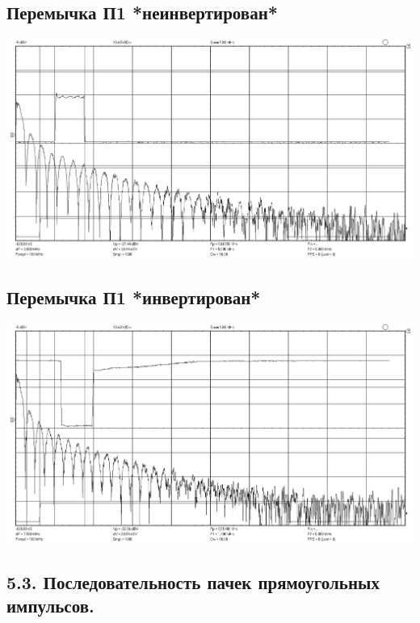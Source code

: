 \documentclass[12pt,a4paper]{article}
\begin{document}
\subsection*{Перемычка П1 *неинвертирован*}
\begin{center}
	\includegraphics[width=.8\linewidth]{data/52}\hfill
\end{center}	
\subsection*{Перемычка П1 *инвертирован*}
\begin{center}
	\includegraphics[width=.8\linewidth]{data/52_inv}\hfill
\end{center}	
\newpage

\subsection*{5.3. Последовательность пачек прямоугольных импульсов.}
\vspace*{20pt}
\end{document}
